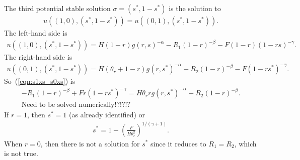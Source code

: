 \documentclass[10pt]{article}
\begin{document}
The third potential stable solution $\sigma = (s^*, 1-s^*)$ is the solution to 
\begin{eqnarray}
\label{eqn:s1xs_s0xs}
u((1,0),(s^*,1-s^*)) = u((0,1),(s^*,1-s^*)).
\end{eqnarray}
The left-hand side is 
\begin{eqnarray} \nonumber
u((1,0),(s^*,1-s^*)) =
H(1-r)g(r,s)^{-\alpha} - R_1(1-r)^{-\beta} - F(1-r)(1-rs)^{-\gamma}.
\end{eqnarray}
The right-hand side is
\begin{eqnarray} \nonumber
u((0,1),(s^*,1-s^*)) = 
H(\theta_r + 1-r)g(r,s^*)^{-\alpha} - R_2(1-r)^{-\beta} - F(1-rs^*)^{-\gamma}.
\end{eqnarray}
So~(\ref{eqn:s1xs_s0xs}) is 
\begin{eqnarray}
-R_1(1-r)^{-\beta} + Fr(1-rs^*)^{-\gamma} =
H\theta_r r g(r,s^*)^{-\alpha} - R_2(1-r)^{-\beta}.\\
\mbox{Need to be solved numerically!?!?!?}
\end{eqnarray}
If $r=1$, then $s^*=1$ (as already identified) or
\begin{eqnarray}
s^* = 1-\left(\frac{F}{H\theta_r^2}\right)^{1/(\gamma+1)}.
\end{eqnarray}
When $r=0$, then there is not a solution for $s^*$ since it reduces to $R_1=R_2$, which is not true.







\end{document}
